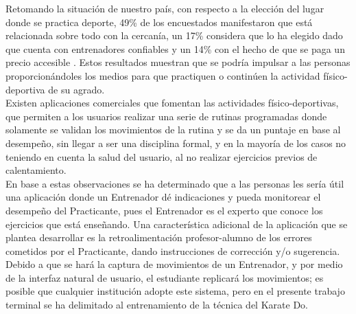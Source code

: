 Retomando la situación de nuestro país, con respecto a la elección del lugar donde se practica deporte, 49\% de los encuestados manifestaron que está relacionada sobre todo con la cercanía, un 17\% considera que lo ha elegido dado que cuenta con entrenadores confiables y un 14\% con el hecho de que se paga un precio accesible \cite{UVM}. Estos resultados muestran que se podría impulsar a las personas proporcionándoles los medios para que practiquen o continúen la actividad físico-deportiva de su agrado.\\

Existen aplicaciones comerciales que fomentan las actividades físico-deportivas, que permiten a los usuarios realizar una serie de rutinas programadas donde solamente se validan los movimientos de la rutina y se da un puntaje en base al desempeño, sin llegar a ser una disciplina formal, y en la mayoría de los casos no teniendo en cuenta la salud del usuario, al no realizar ejercicios previos de calentamiento.\\

En base a estas observaciones se ha determinado que a las personas les sería útil una aplicación donde un Entrenador dé indicaciones y pueda monitorear el desempeño del Practicante, pues el Entrenador es el experto que conoce los ejercicios que está enseñando. Una característica adicional de la aplicación que se plantea desarrollar es la retroalimentación profesor-alumno de los errores cometidos por el Practicante, dando instrucciones  de corrección y/o sugerencia.\\

Debido a que se hará la captura de movimientos de un Entrenador, y por medio de la interfaz natural de usuario, el estudiante replicará los movimientos; es posible que cualquier institución adopte este sistema, pero en el presente trabajo terminal se ha delimitado al entrenamiento de la técnica del Karate Do.